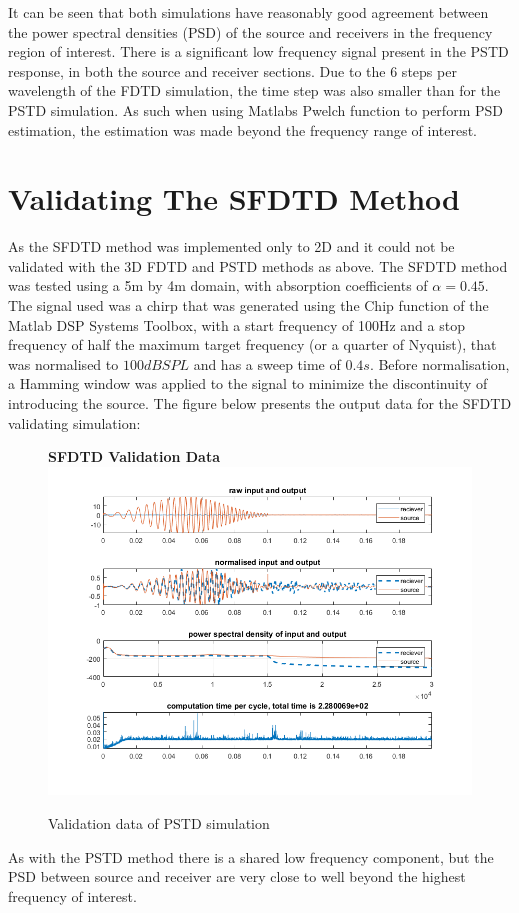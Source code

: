 It can be seen that both simulations have reasonably good agreement between the power spectral densities (PSD) of the source and receivers in the frequency region of interest. There is a significant low frequency signal present in the PSTD response, in both the source and receiver sections.  Due to the 6 steps per wavelength of the FDTD simulation, the time step was also smaller than for the PSTD simulation. As such when using Matlabs Pwelch function to perform PSD estimation, the estimation was made beyond the frequency range of interest.\\


\section{Validating The SFDTD Method}
As the SFDTD method was implemented only to 2D and it could not be validated with the 3D FDTD and PSTD methods as above. The SFDTD method was tested using a 5m by 4m domain, with absorption coefficients of $ \alpha = 0.45$. The signal used was a chirp that was generated using the Chip function of the Matlab DSP Systems Toolbox, with a start frequency of 100Hz and a stop frequency of half the maximum target frequency (or a quarter of Nyquist), that was normalised to $100dBSPL$ and has a sweep time of $0.4s$. Before normalisation, a Hamming window was applied to the signal to minimize the discontinuity of introducing the source. The figure below presents the output data for the SFDTD validating simulation:\\

\begin{figure}[H]
\centering
\textbf{SFDTD Validation Data}
  \includegraphics[width=\textwidth]{./graphics/SFDTDvalidationFinal.png}
  \caption{Validation data of PSTD simulation}
\end{figure}
As with the PSTD method there is a shared low frequency component, but the PSD between source and receiver are very close to well beyond the highest frequency of interest.